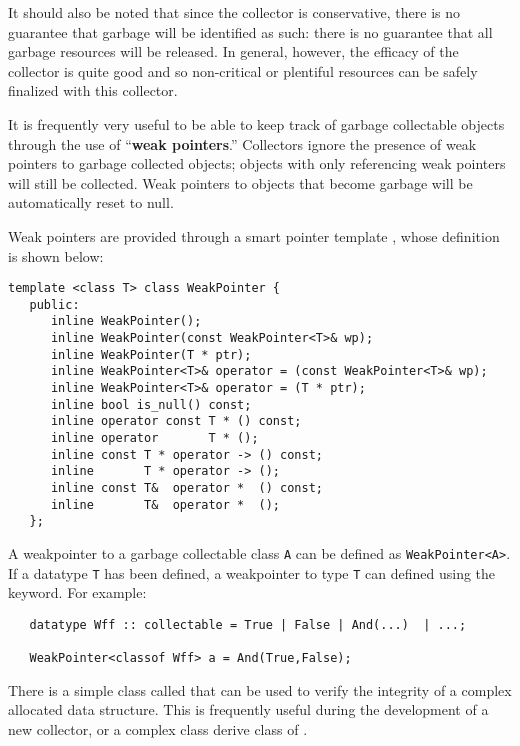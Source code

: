    It should also be noted that since the collector is conservative, there
is no guarantee that garbage will be identified as such:
there is no guarantee that all garbage resources will be released.
In general, however, the efficacy of the collector is quite good and
so non-critical or plentiful resources can be safely finalized with
this collector.


   It is frequently very useful to be able to keep track of garbage
collectable objects through the use of ``{\bf weak pointers}.''
Collectors ignore the presence of weak pointers to garbage collected
objects; objects with only referencing weak pointers will still be
collected.  Weak pointers to objects that become garbage will
be automatically reset to null.
 
   Weak pointers are provided through a smart pointer template 
, whose definition is shown below: 

\begin{verbatim}
template <class T> class WeakPointer {
   public:
      inline WeakPointer();
      inline WeakPointer(const WeakPointer<T>& wp); 
      inline WeakPointer(T * ptr); 
      inline WeakPointer<T>& operator = (const WeakPointer<T>& wp);
      inline WeakPointer<T>& operator = (T * ptr);
      inline bool is_null() const;
      inline operator const T * () const;
      inline operator       T * ();
      inline const T * operator -> () const;
      inline       T * operator -> ();
      inline const T&  operator *  () const;
      inline       T&  operator *  ();
   };
\end{verbatim}

A weakpointer to a garbage collectable 
class \verb|A| can be defined as \verb|WeakPointer<A>|.
If a \Prop{} datatype \verb|T| has been defined, a weakpointer to type
\verb|T| can defined using the
 keyword.  For example:

\begin{verbatim}
   datatype Wff :: collectable = True | False | And(...)  | ...;

   WeakPointer<classof Wff> a = And(True,False);
\end{verbatim}


   There is a simple class called  that can be used
to verify the integrity of a complex allocated data structure.
This is frequently useful during the development of a new collector,
or a complex class derive class of .

